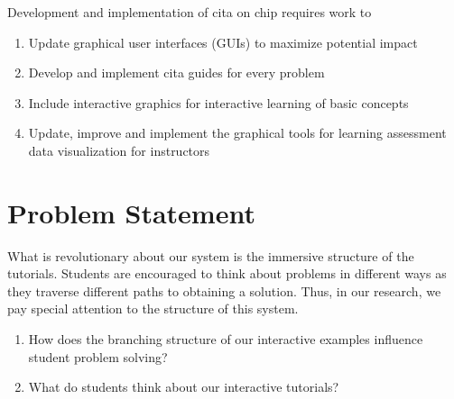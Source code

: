 Development and implementation of \gls{cita} on \gls{chip} requires work to

\begin{enumerate}
\item Update graphical user interfaces (GUIs) to maximize potential impact
\item Develop and implement \gls{cita} guides for every problem
\item Include interactive graphics for interactive learning of basic concepts
\item Update, improve and implement the graphical tools for learning assessment data visualization for instructors
\end{enumerate}

\section{Problem Statement}

What is revolutionary about our system is the immersive structure of the tutorials. Students are encouraged to think about problems in different ways as they traverse different paths to obtaining a solution. Thus, in our research, we pay special attention to the structure of this system.

\begin{enumerate}
\item How does the branching structure of our interactive examples influence student problem solving?
\item What do students think about our interactive tutorials?
\end{enumerate}